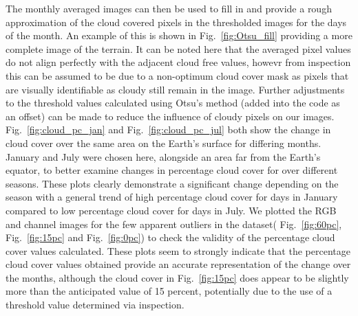 The monthly averaged images can then be used to fill in and provide a rough approximation of the cloud covered pixels in the thresholded images for the days of the month. An example of this is shown in Fig.~\ref{fig:Otsu_fill} providing a more complete image of the terrain. It can be noted here that the averaged pixel values do not align perfectly with the adjacent cloud free values, howevr from inspection this can be assumed to be due to a non-optimum cloud cover mask as pixels that are visually identifiable as cloudy still remain in the image. Further adjustments to the threshold values calculated using Otsu's method (added into the code as an offset) can be made to reduce the influence of cloudy pixels on our images.\\

Fig.~\ref{fig:cloud_pc_jan} and Fig.~\ref{fig:cloud_pc_jul} both show the change in cloud cover over the same area on the Earth's surface for differing months. January and July were chosen here, alongside an area far from the Earth's equator, to better examine changes in percentage cloud cover for over different seasons. These plots clearly demonstrate a significant change depending on the season with a general trend of high percentage cloud cover for days in January compared to low percentage cloud cover for days in July. We plotted the RGB and channel images for the few apparent outliers in the dataset( Fig.~\ref{fig:60pc}, Fig.~\ref{fig:15pc} and Fig.~\ref{fig:0pc}) to check the validity of the percentage cloud cover values calculated. These plots seem to strongly indicate that the percentage cloud cover values obtained provide an accurate representation of the change over the months, although the cloud cover in Fig.~\ref{fig:15pc} does appear to be slightly more than the anticipated value of 15 percent, potentially due to the use of a threshold value determined via inspection. \\

